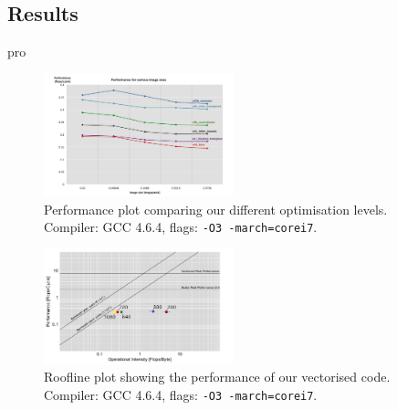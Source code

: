 \subsection{Results}
pro
\setlength\fboxsep{0pt}
\setlength\fboxrule{0.5pt}
 
\begin{figure}\vspace{-1mm}
  \includegraphics[trim=10mm 0mm 10mm 0mm, clip, width=0.49\textwidth]{figures/performance}
  \caption{Performance plot comparing our different optimisation levels. Compiler: GCC 4.6.4, flags: \lstinline{-O3 -march=corei7}.\label{performance}}
\end{figure}
 
\begin{figure}\vspace{-1mm}
  \includegraphics[trim=10mm 0mm 10mm 0mm, clip, width=0.49\textwidth]{figures/roofline}
  \caption{Roofline plot showing the performance of our vectorised code. Compiler: GCC 4.6.4, flags: \lstinline{-O3 -march=corei7}.\label{roofline}}
\end{figure}


